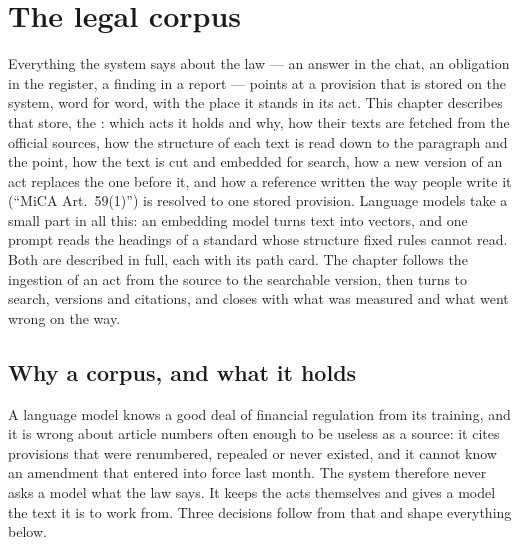\chapter{The legal corpus}\label{ch:corpus}

Everything the system says about the law --- an answer in the chat, an obligation in the
register, a finding in a report --- points at a provision that is stored on the system, word for
word, with the place it stands in its act. This chapter describes that store, the
: which acts it holds and why, how their texts are fetched from the official
sources, how the structure of each text is read down to the paragraph and the point, how the
text is cut and embedded for search, how a new version of an act replaces the one before it,
and how a reference written the way people write it (\enquote{MiCA Art.~59(1)}) is resolved to
one stored provision. Language models take a small part in all this: an embedding model turns
text into vectors, and one prompt reads the headings of a standard whose structure fixed rules
cannot read. Both are described in full, each with its path card. The chapter follows the
ingestion of an act from the source to the searchable version, then turns to search, versions
and citations, and closes with what was measured and what went wrong on the way.


\section{Why a corpus, and what it holds}\label{sec:corpus:why}

A language model knows a good deal of financial regulation from its training, and it is wrong
about article numbers often enough to be useless as a source: it cites provisions that were
renumbered, repealed or never existed, and it cannot know an amendment that entered into force
last month. The system therefore never asks a model what the law says. It keeps the acts
themselves and gives a model the text it is to work from. Three decisions follow from that and
shape everything below.

